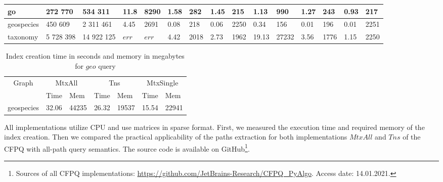 {\begin{table}[t]
{\begin{tabular}{|l|l|l|l|l|l|l|l|l|l|l|l|l|l|l|}
				go           & 272 770 & 534 311                                & 11.8          & 8290        & 1.58        & 282        & 1.45        & 215        & 1.13          & 990         & 1.27        & 243        & 0.93        & 217     \\ \hline
				geospecies   & 450 609 & 2 311 461                                & 4.45          & 2691        & 0.08        & 218        & 0.06        & 2250       & 0.34          & 156         & 0.01        & 196        & 0.01        & 2251      \\ \hline %
				taxonomy       & 5 728 398 & 14 922 125                              & $err$           & $err$         & 4.42        & 2018       & 2.73        & 1962       & 19.13         & 27232       & 3.56        & 1776       & 1.15        & 2250     \\ \hline
			\end{tabular}
		}
	\end{table}
}


{\setlength{\tabcolsep}{0.25em}
	\begin{table}
		{
			\caption{Index creation time in seconds and memory in megabytes for $geo$ query}
			\label{tbl:index_creation_geo}
			\small
			\begin{tabular}{|l|l|l|l|l|l|l|}
				\hline
				\multicolumn{1}{|c|}{\multirow{2}{*}{Graph}} & \multicolumn{2}{c|}{MtxAll}                                                           &
				\multicolumn{2}{c|}{Tns}                                                           &
				\multicolumn{2}{c|}{MtxSingle}                                                                                                                                                    \\ \cline{2-7}
				\multicolumn{1}{|c|}{}                       & Time          & Mem         & Time        & Mem        & Time        & Mem  \\ \hline \hline
				geospecies  & 32.06         & 44235       & 26.32       & 19537      & 15.54       & 22941      \\ \hline
			\end{tabular}
		}
	\end{table}
}


All implementations utilize CPU and use matrices in sparse format. First, we measured the execution time and required memory of the index creation. Then we compared the practical applicability of the paths extraction for both implementations $MtxAll$ and $Tns$ of the CFPQ with all-path query semantics. The source code is available on GitHub\footnote{Sources of all CFPQ implementations: \url{https://github.com/JetBrains-Research/CFPQ\_PyAlgo}. Access date: 14.01.2021.}.

